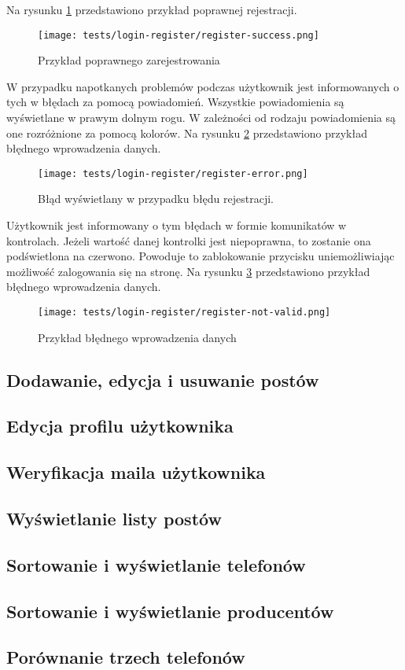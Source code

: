 Na rysunku \ref{success_register} przedstawiono przykład poprawnej rejestracji.
\begin{figure}[H]
  \centering
  \texttt{[image: tests/login-register/register-success.png]}
  \caption{Przykład poprawnego zarejestrowania}
  \label{success_register}
\end{figure}
W przypadku napotkanych problemów podczas użytkownik jest informowanych o tych w błędach za pomocą powiadomień. Wszystkie powiadomienia są wyświetlane w prawym dolnym rogu. W zależności od rodzaju powiadomienia są one rozróżnione za pomocą kolorów. Na rysunku \ref{register_error} przedstawiono przykład błędnego wprowadzenia danych.
\begin{figure}[H]
  \centering
  \texttt{[image: tests/login-register/register-error.png]}
  \caption{Błąd wyświetlany w przypadku błędu rejestracji.}
  \label{register_error}
\end{figure}
Użytkownik jest informowany o tym błędach w formie komunikatów w kontrolach. Jeżeli wartość danej kontrolki jest niepoprawna, to zostanie ona podświetlona na czerwono. Powoduje to zablokowanie przycisku uniemożliwiając możliwość zalogowania się na stronę. Na rysunku \ref{login_error} przedstawiono przykład błędnego wprowadzenia danych.
\begin{figure}[H]
  \centering
  \texttt{[image: tests/login-register/register-not-valid.png]}
  \caption{Przykład błędnego wprowadzenia danych}
  \label{login_error}
\end{figure}

\subsection{Dodawanie, edycja i usuwanie postów}

\subsection{Edycja profilu użytkownika}

\subsection{Weryfikacja maila użytkownika}

\subsection{Wyświetlanie listy postów}

\subsection{Sortowanie i wyświetlanie telefonów}

\subsection{Sortowanie i wyświetlanie producentów}

\subsection{Porównanie trzech telefonów}
